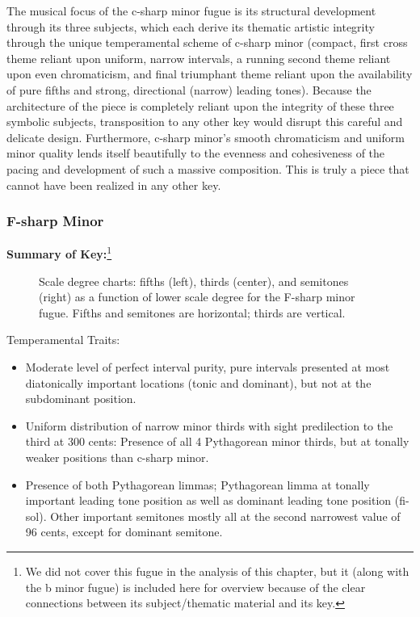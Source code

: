 The musical focus of the c-sharp minor fugue is its structural
development through its three subjects, which each derive its thematic
artistic integrity through the unique temperamental scheme of c-sharp
minor (compact, first cross theme reliant upon uniform, narrow
intervals, a running second theme reliant upon even chromaticism, and
final triumphant theme reliant upon the availability of pure fifths and
strong, directional (narrow) leading tones). Because the architecture of
the piece is completely reliant upon the integrity of these three
symbolic subjects, transposition to any other key would disrupt this
careful and delicate design. Furthermore, c-sharp minor's smooth
chromaticism and uniform minor quality lends itself beautifully to the
evenness and cohesiveness of the pacing and development of such a
massive composition. This is truly a piece that cannot have been
realized in any other key.

    \subsubsection{F-sharp Minor}\label{f-sharp-minor}

\textbf{Summary of
Key:}\footnote{We did not cover this fugue in the analysis of this chapter, but it (along with the b minor fugue) is included here for overview because of the clear connections between its subject/thematic material and its key.}



\begin{figure}[H]
\vspace{1.5em}
    \centering
    \caption[Scale degree charts: fifths, thirds, and semitones as a function of lower scale degree for the F-sharp minor fugue. ]{Scale degree charts: fifths (left), thirds (center), and semitones (right) as a function of lower scale degree for the F-sharp minor fugue. Fifths and semitones are horizontal; thirds are vertical.}
\end{figure}    Temperamental Traits:

\begin{itemize}
\tightlist
\item
  Moderate level of perfect interval purity, pure intervals presented at
  most diatonically important locations (tonic and dominant), but not at
  the subdominant position.
\item
  Uniform distribution of narrow minor thirds with sight predilection to
  the third at 300 cents: Presence of all 4 Pythagorean minor thirds,
  but at tonally weaker positions than c-sharp minor.
\item
  Presence of both Pythagorean limmas; Pythagorean limma at tonally
  important leading tone position as well as dominant leading tone
  position (fi-sol). Other important semitones mostly all at the second
  narrowest value of 96 cents, except for dominant semitone.
\end{itemize}

